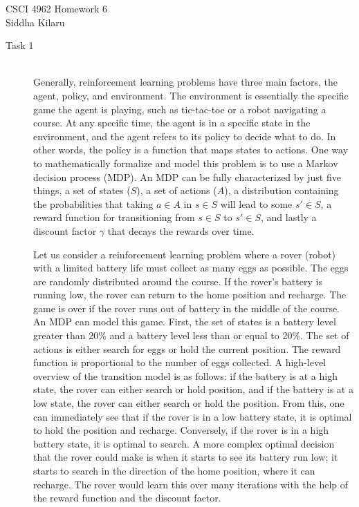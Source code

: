 \documentclass[12pt]{article}
\begin{document}
\noindent CSCI 4962 \hfill Homework 6 \\
Siddha Kilaru \\

\begin{description}
    \item[Task 1] \hfill \\
    Generally, reinforcement learning problems have three main factors, the
    agent, policy, and environment. The environment is essentially the specific
    game the agent is playing, such as tic-tac-toe or a robot navigating a
    course. At any specific time, the agent is in a specific state in the
    environment, and the agent refers to its policy to decide what to do. In
    other words, the policy is a function that maps states to actions. One way
    to mathematically formalize and model this problem is to use a Markov
    decision process (MDP). An MDP can be fully characterized by just five
    things, a set of states ($S$), a set of actions ($A$), a distribution
    containing the probabilities that taking $a\in A$ in $s\in S$ will lead to
    some $s'\in S$, a reward function for transitioning from $s \in S$ to $s'
    \in S$, and lastly a discount factor $\gamma$ that decays the rewards over
    time. 

    Let us consider a reinforcement learning problem where a rover (robot) with
    a limited battery life must collect as many eggs as possible. The eggs are
    randomly distributed around the course. If the rover's battery is running
    low, the rover can return to the home position and recharge. The game is
    over if the rover runs out of battery in the middle of the course. An MDP
    can model this game. First, the set of states is a battery level greater
    than 20\% and a battery level less than or equal to 20\%. The set of
    actions is either search for eggs or hold the current position. The reward
    function is proportional to the number of eggs collected. A high-level
    overview of the transition model is as follows: if the battery is at a high
    state, the rover can either search or hold position, and if the battery is
    at a low state, the rover can either search or hold the position. From
    this, one can immediately see that if the rover is in a low battery state,
    it is optimal to hold the position and recharge. Conversely, if the rover
    is in a high battery state, it is optimal to search. A more complex optimal
    decision that the rover could make is when it starts to see its battery run
    low; it starts to search in the direction of the home position, where it
    can recharge. The rover would learn this over many iterations with the help
    of the reward function and the discount factor. 


\end{description}
\end{document}

